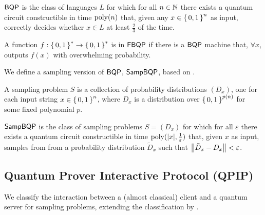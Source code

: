 \begin{definition} [$\BQP$]
	$\BQP$ is the class of languages $L$ for which for all $n\in\mathbb{N}$ there exists a quantum circuit constructible in time $\operatorname*{\operatorname{poly}}(n)$ that, given any $x\in\set{0, 1}^n$ as input, correctly decides whether $x\in L$ at least $\frac{2}{3}$ of the time.

\begin{definition} [$\FBQP$]
	A function $f:\set{0,1}^*\rightarrow\set{0,1}^*$ is in $\FBQP$ if there is a $\BQP$ machine that, $\forall x$, outputs $f(x)$ with overwhelming probability.
\end{definition}

We define a sampling version of $\BQP$, $\SampBQP$, based on \cite{aaronson_2013}.

\begin{definition} 
	A sampling problem $S$ is a collection of probability distributions $(D_x)$, one for each input string $x\in\set{0,1}^n$, where $D_x$ is a distribution over $\set{0,1}^{p(n)}$ for some fixed polynomial $p$.
\end{definition}

\begin{definition} [$\SampBQP$]
	$\SampBQP$ is the class of sampling problems $S=(D_x)$ for which for all $\varepsilon$ there exists a quantum circuit constructible in time $\operatorname*{\operatorname{poly}}(|x|, \frac{1}{\varepsilon})$ that, given $x$ as input, samples from from a probability distribution $\tilde{D}_x$ such that $\left\lVert\tilde{D}_x-D_x\right\rVert<\varepsilon$.
\end{definition}

\subsection{Quantum Prover Interactive Protocol (QPIP)}
We classify the interaction between a (almost classical) client and a quantum server for sampling problems, extending the classification by \cite{FOCS:Mahadev18a}.


\end{definition}
